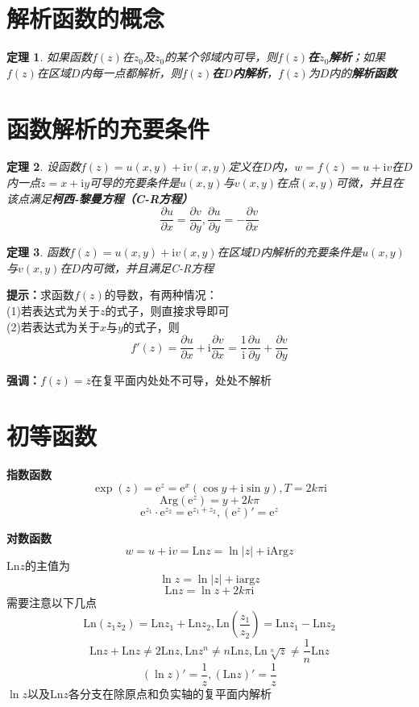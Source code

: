 \documentclass[12pt, a4paper, twoside]{ctexbook}
\newtheorem{theorem}{定理}[section]
\begin{document}
\section{解析函数的概念}
\begin{theorem}
	如果函数$f\left(z\right)$在$z_0$及$z_0$的某个邻域内可导，则\textbf{$f\left(z\right)$在$z_0$解析}；如果$f\left(z\right)$在区域$D$内每一点都解析，则\textbf{$f\left(z\right)$在$D$内解析}，$f\left(z\right)$为$D$内的\textbf{解析函数}
\end{theorem}
\section{函数解析的充要条件}
\begin{theorem}
	设函数$f\left(z\right)=u\left(x,y\right)+\mathrm{i}v\left(x,y\right)$定义在$D$内，$w=f\left(z\right)=u+\mathrm{i}v$在$D$内一点$z=x+\mathrm{i}y$可导的充要条件是$u\left(x,y\right)$与$v\left(x,y\right)$在点$\left(x,y\right)$可微，并且在该点满足\textbf{柯西-黎曼方程（C-R方程）}
	$$
	\frac{\partial u}{\partial x}=\frac{\partial v}{\partial y},\frac{\partial u}{\partial y}=-\frac{\partial v}{\partial x}
	$$
\end{theorem}
\begin{theorem}
	函数$f\left(z\right)=u\left(x,y\right)+\mathrm{i}v\left(x,y\right)$在区域$D$内解析的充要条件是$u\left(x,y\right)$与$v\left(x,y\right)$在$D$内可微，并且满足C-R方程
\end{theorem}
\textbf{提示：}求函数$f\left(z\right)$的导数，有两种情况：\\
(1)若表达式为关于$z$的式子，则直接求导即可\\
(2)若表达式为关于$x$与$y$的式子，则
$$
f'\left(z\right)=\frac{\partial u}{\partial x}+\mathrm{i}\frac{\partial v}{\partial x}=\frac{1}{\mathrm{i}}\frac{\partial u}{\partial y}+\frac{\partial v}{\partial y}
$$

\textbf{强调：}$f\left(z\right)=\overline{z}$在复平面内处处不可导，处处不解析
\section{初等函数}
\textbf{指数函数}
$$
\exp\left(z\right)=\mathrm{e}^z=\mathrm{e}^x\left(\cos y+\mathrm{i}\sin y\right),T=2k\pi\mathrm{i}
$$
$$
\mathrm{Arg}\left(\mathrm{e}^z\right)=y+2k\pi
$$
$$
\mathrm{e}^{z_1}\cdot\mathrm{e}^{z_2}=\mathrm{e}^{z_1+z_2},\left(\mathrm{e}^z\right)'=\mathrm{e}^z
$$

\textbf{对数函数}
$$
w=u+\mathrm{i}v=\mathrm{Ln}z=\ln \left| z \right| +\mathrm{iArg}z
$$
$\mathrm{Ln}z$的主值为
$$
\ln z = \ln \left|z\right|+\mathrm{iarg}z
$$
$$
\mathrm{Ln}z=\ln z +2k\pi\mathrm{i}
$$
需要注意以下几点
$$
\mathrm{Ln}\left(z_1z_2\right)=\mathrm{Ln}z_1+\mathrm{Ln}z_2,\mathrm{Ln}\left(\frac{z_1}{z_2}\right)=\mathrm{Ln}z_1-\mathrm{Ln}z_2
$$
$$
\mathrm{Ln}z+\mathrm{Ln}z\neq 2\mathrm{Ln}z,\mathrm{Ln}z^n\neq n\mathrm{Ln}z,\mathrm{Ln}\sqrt[n]{z}\neq \frac{1}{n}\mathrm{Ln}z
$$
$$
\left(\ln z\right)'=\frac{1}{z},\left(\mathrm{Ln}z\right)'=\frac{1}{z}
$$
$\ln z$以及$\mathrm{Ln}z$各分支在除原点和负实轴的复平面内解析
\end{document}
